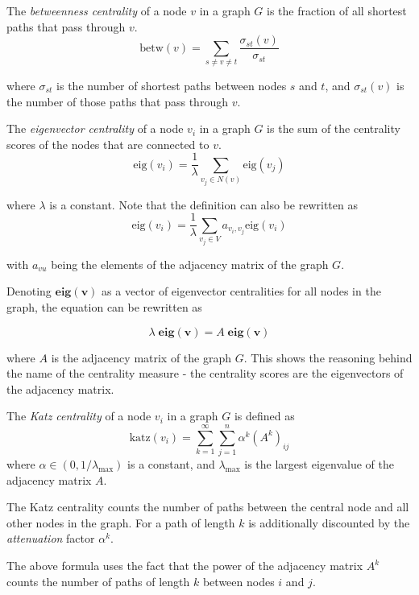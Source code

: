 \begin{definition}
    The \textit{betweenness centrality} of a node $v$ in a graph $G$ is the fraction of all shortest paths that pass through $v$.
    $$
    \text{betw}(v) = \sum_{s \neq v \neq t} \frac{\sigma_{st}(v)}{\sigma_{st}}
    $$

    where $\sigma_{st}$ is the number of shortest paths between nodes $s$ and $t$, and $\sigma_{st}(v)$ is the number of those paths that pass through $v$.
\end{definition}

\begin{definition}
    The \textit{eigenvector centrality} of a node $v_i$ in a graph $G$ is the sum of the centrality scores of the nodes that are connected to $v$.
    $$
    \text{eig}(v_i) = \frac{1}{\lambda} \sum_{v_j \in N(v)} \text{eig}(v_j)
    $$

    where $\lambda$ is a constant. Note that the definition can also be rewritten as 
    $$
    \text{eig}(v_i) = \frac{1}{\lambda} \sum_{v_j \in V} a_{v_i, v_j} \text{eig}(v_i)
    $$

    with $a_{vu}$ being the elements of the adjacency matrix of the graph $G$.
    
    Denoting $\mathbf{eig(v)}$ as a vector of eigenvector centralities for all nodes in the graph, the equation can be rewritten as

    $$
    \lambda \; \mathbf{eig(v)} = A \; \mathbf{eig(v)}
    $$

    where $A$ is the adjacency matrix of the graph $G$. 
    This shows the reasoning behind the name of the centrality measure - the centrality scores are the eigenvectors of the adjacency matrix.
\end{definition}

\begin{definition}
    The \textit{Katz centrality} of a node $v_i$ in a graph $G$ is defined as
    $$
    \text{katz}(v_i) = \sum_{k=1}^{\infty} \sum_{j=1}^n \alpha^k (A^k)_{ij}
    $$
    where $\alpha \in (0, 1/\lambda_{\text{max}})$ is a constant, and $\lambda_{\text{max}}$ is the largest eigenvalue of the adjacency matrix $A$.

    The Katz centrality counts the number of paths between the central node and all other nodes in the graph.
    For a path of length $k$ is additionally discounted by the \textit{attenuation} factor $\alpha^k$.

    The above formula uses the fact that the power of the adjacency matrix $A^k$ counts the number of paths of length $k$ between nodes $i$ and $j$.
\end{definition}

